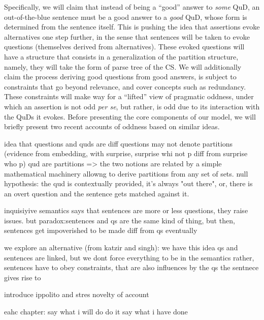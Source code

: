 Specifically, we will claim that instead of being a ``good'' answer to \textit{some} QuD, an out-of-the-blue sentence must be a good answer to a \textit{good} QuD, whose form is determined from the sentence itself. This is pushing the idea that assertions evoke alternatives one step further, in the sense that sentences will be taken to evoke questions (themselves derived from alternatives). These evoked questions will have a structure that consists in a generalization of the partition structure, namely, they will take the form of parse tree of the CS. We will additionally claim the process deriving good questions from good answers, is subject to constraints that go beyond relevance, and cover concepts such as redundancy. These constraints will make way for a ``lifted'' view of pragmatic oddness, under which an assertion is not odd \textit{per se}, but rather, is odd due to its interaction with the QuDs it evokes. Before presenting the core components of our model, we will briefly present two recent accounts of oddness based on similar ideas.














idea that questions and quds are diff
questions may not denote partitions (evidence from embedding, with surprise, surprise whi not p diff from surprise who p)
qud are partitions
=> the two notions are related by a simple mathematical machinery allowng to derive partitions from any set of sets.
null hypothesis: the qud is contextually provided, it's always "out there", or, there is an overt question and the sentence gets matched against it.


inquisiyive semantics says that sentences are more or less questions, they raise issues.
but paradox:sentences and qs are the same kind of thing, but then, sentences get impoverished to be made diff from qs eventually

we explore an alternative (from katzir and singh): we have this idea qs and sentences are linked, but we dont force everything to be in the semantics
 rather, sentences have to obey constraints, that are also influences by the qs the sentnece gives rise to
 

introduce ippolito and stres novelty of account


eahc chapter: say what i will do
do it
say what i have done




